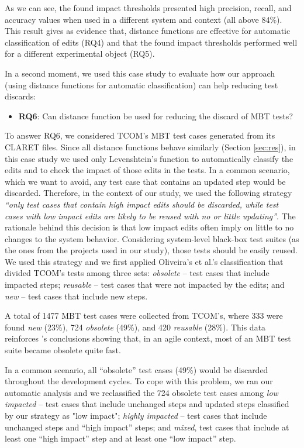 As we can see, the found impact thresholds presented high precision, recall, and accuracy values when used in a different system and context (all above 84\%). This result gives as evidence that, distance functions are effective for automatic classification of edits (RQ4) and that the found impact thresholds performed well for a different experimental object (RQ5).

In a second moment,  
we used this case study to evaluate how our approach (using distance functions for automatic classification) can help reducing test discards:
\begin{itemize}
\item \textbf{RQ6}: Can distance function be used for reducing the discard of MBT tests? 
\end{itemize}

To answer RQ6, we considered TCOM's MBT test cases generated from its CLARET files. Since all distance functions behave similarly (Section \ref{sec:res}), in this case study we used only Levenshtein's function to automatically classify the edits and to check the impact of those edits in the tests. In a common scenario, which we want to avoid, any test case that contains an updated step would be discarded. Therefore, in the context of our study, we used the following strategy \textit{``only test cases that contain high impact edits should be discarded, while test cases with low impact edits are likely to be reused with no or little updating''}. The rationale behind this decision is that low impact edits often imply on little to no changes to the system behavior. Considering system-level black-box test suites (as the ones from the projects used in our study), those tests should be easily reused. We used this strategy and we first applied Oliveira's et al.'s  classification \citep{de2016full} that divided TCOM's tests among three sets:  \textit{obsolete} -- test cases that include impacted steps; \textit{reusable} -- test cases that were not impacted by the edits; and \textit{new} -- test cases that include new steps. 

A total of 1477 MBT test cases were collected from TCOM's, where 333 were found \textit{new} (23\%), 724 \textit{obsolete} (49\%), and 420 \textit{reusable} (28\%). This data reinforces \citet{Silva:2018:SIM:3266003.3266009}'s 
conclusions showing that, in an agile context, most of an MBT test suite became obsolete quite fast. 

In a common scenario, all ``obsolete'' test cases (49\%) would be discarded throughout the development cycles. To cope with this problem, we ran our automatic analysis and we reclassified the 724 obsolete test cases among \textit{low impacted} -- test cases that include unchanged steps and updated steps classified by our strategy as "low impact"; \textit{highly impacted} -- test cases that include unchanged steps and ``high impact'' steps; and \textit{mixed}, test cases that include at least one ``high impact'' step and at least one ``low impact'' step. 



